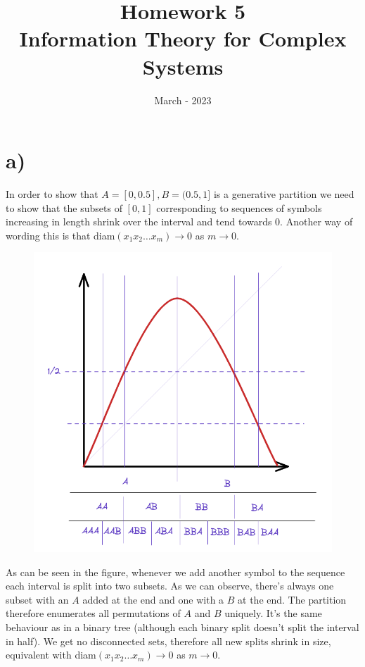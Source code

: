 \documentclass[a4paper, 12pt]{article}
\begin{document}
\title{\vspace{-6em}\textbf{Homework 5}\\ \Large Information Theory for Complex Systems \vspace{-3.2em} }
\author{} \date{March - 2023}

\maketitle

\section*{a)}
In order to show that $A = [0, 0.5], B = (0.5,1]$ is a generative partition we need to show that the subsets of $[0,1]$ corresponding to sequences of symbols increasing in length shrink over the interval and tend towards 0. Another way of wording this is that diam$(x_1 x_2 \dots x_m) \rightarrow 0$ as $m \rightarrow 0$.

\begin{figure}[ht!]
    \centering
    \includegraphics[width=0.5 \linewidth]{map.png}
\end{figure}

As can be seen in the figure, whenever we add another symbol to the sequence each interval is split into two subsets. As we can observe, there's always one subset with an $A$ added at the end and one with a $B$ at the end. The partition therefore enumerates all permutations of $A$ and $B$ uniquely. It's the same behaviour as in a binary tree (although each binary split doesn't split the interval in half). We get no disconnected sets, therefore all new splits shrink in size, equivalent with diam$(x_1 x_2 \dots x_m) \rightarrow 0$ as $m \rightarrow 0$.
\end{document}
